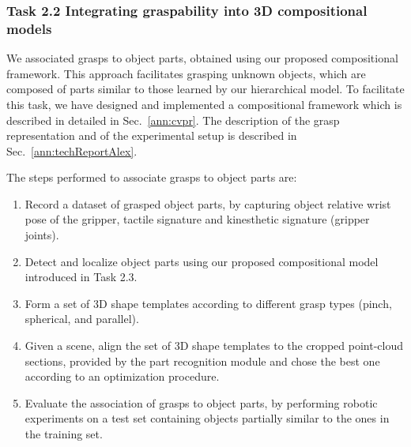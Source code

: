 \documentclass[a4paper,11pt,pdf]{pacmanreport}
\begin{document}



\subsubsection{Task 2.2 Integrating graspability into 3D compositional models}

We associated grasps to object parts, obtained using our proposed compositional framework. This approach facilitates grasping unknown objects, which are composed of parts similar to those learned by our hierarchical model. To facilitate this task, we have designed and implemented a compositional framework which is described in detailed in Sec.~\ref{ann:cvpr}. The description of the grasp representation and of the experimental setup is described in Sec.~\ref{ann:techReportAlex}.%

The steps performed to associate grasps to object parts are:
\begin{enumerate}
\item Record a dataset of grasped object parts, by capturing object relative wrist pose of the gripper, tactile signature and kinesthetic signature (gripper joints).
\item Detect and localize object parts using our proposed compositional model introduced in Task 2.3.
\item Form a set of 3D shape templates according to different grasp types (pinch, spherical, and parallel).
\item Given a scene, align the set of 3D shape templates to the cropped point-cloud sections, provided by the part recognition module and chose the best one according to an optimization procedure.
\item Evaluate the association of grasps to object parts, by performing robotic experiments on a test set containing objects partially similar to the ones in the training set.
\end{enumerate}
\end{document}
